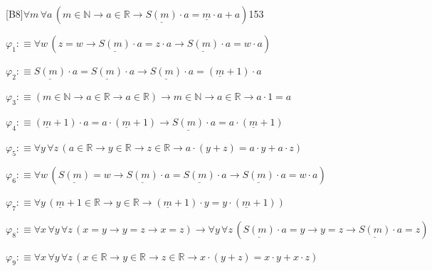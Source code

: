\begin{fullproof}{[B8]}{$\forall m\,\forall a\,(m \in \mathbb{N} \to a \in \mathbb{R} \to \underline{S(m)} \cdot a = \underline{m} \cdot a + a)$}{153}
\begin{ptree}
\noLine
{}
\noLine
{}
\end{ptree}
\begin{abbrevlist}
\item $\varphi_{1} :\equiv \forall w\,(z = w \to \underline{S(m)} \cdot a = z \cdot a \to \underline{S(m)} \cdot a = w \cdot a)$
\item $\varphi_{2} :\equiv \underline{S(m)} \cdot a = \underline{S(m)} \cdot a \to \underline{S(m)} \cdot a = (\underline{m} + 1) \cdot a$
\item $\varphi_{3} :\equiv (m \in \mathbb{N} \to a \in \mathbb{R} \to a \in \mathbb{R}) \to m \in \mathbb{N} \to a \in \mathbb{R} \to a \cdot 1 = a$
\item $\varphi_{4} :\equiv (\underline{m} + 1) \cdot a = a \cdot (\underline{m} + 1) \to \underline{S(m)} \cdot a = a \cdot (\underline{m} + 1)$
\item $\varphi_{5} :\equiv \forall y\,\forall z\,(a \in \mathbb{R} \to y \in \mathbb{R} \to z \in \mathbb{R} \to a \cdot (y + z) = a \cdot y + a \cdot z)$
\item $\varphi_{6} :\equiv \forall w\,(\underline{S(m)} = w \to \underline{S(m)} \cdot a = \underline{S(m)} \cdot a \to \underline{S(m)} \cdot a = w \cdot a)$
\item $\varphi_{7} :\equiv \forall y\,(\underline{m} + 1 \in \mathbb{R} \to y \in \mathbb{R} \to (\underline{m} + 1) \cdot y = y \cdot (\underline{m} + 1))$
\item $\varphi_{8} :\equiv \forall x\,\forall y\,\forall z\,(x = y \to y = z \to x = z) \to \forall y\,\forall z\,(\underline{S(m)} \cdot a = y \to y = z \to \underline{S(m)} \cdot a = z)$
\item $\varphi_{9} :\equiv \forall x\,\forall y\,\forall z\,(x \in \mathbb{R} \to y \in \mathbb{R} \to z \in \mathbb{R} \to x \cdot (y + z) = x \cdot y + x \cdot z)$

\end{abbrevlist}
\end{fullproof}
